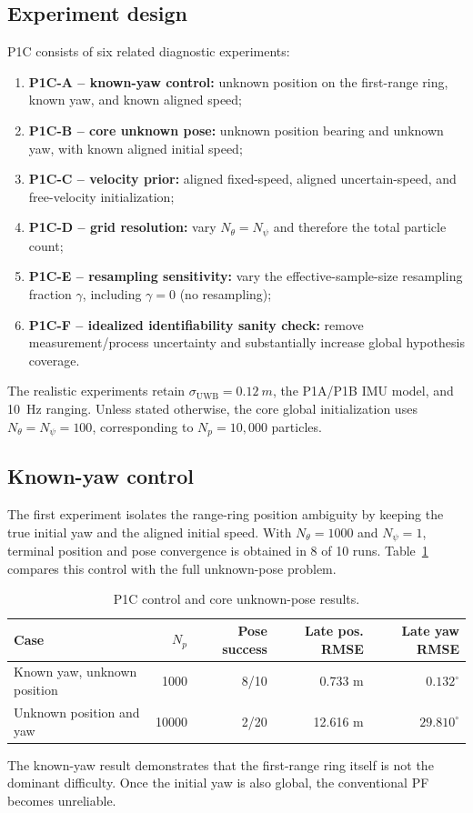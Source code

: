 \subsection{Experiment design}
P1C consists of six related diagnostic experiments:
\begin{enumerate}
    \item \textbf{P1C-A -- known-yaw control:} unknown position on the first-range ring, known yaw, and known aligned speed;
    \item \textbf{P1C-B -- core unknown pose:} unknown position bearing and unknown yaw, with known aligned initial speed;
    \item \textbf{P1C-C -- velocity prior:} aligned fixed-speed, aligned uncertain-speed, and free-velocity initialization;
    \item \textbf{P1C-D -- grid resolution:} vary $N_{\theta}=N_{\psi}$ and therefore the total particle count;
    \item \textbf{P1C-E -- resampling sensitivity:} vary the effective-sample-size resampling fraction $\gamma$, including $\gamma=0$ (no resampling);
    \item \textbf{P1C-F -- idealized identifiability sanity check:} remove measurement/process uncertainty and substantially increase global hypothesis coverage.
\end{enumerate}
The realistic experiments retain $\sigma_{\mathrm{UWB}}=\SI{0.12}{m}$, the P1A/P1B IMU model, and \SI{10}{Hz} ranging. Unless stated otherwise, the core global initialization uses $N_{\theta}=N_{\psi}=100$, corresponding to $N_p=10{,}000$ particles.

\subsection{Known-yaw control}
The first experiment isolates the range-ring position ambiguity by keeping the true initial yaw and the aligned initial speed. With $N_{\theta}=1000$ and $N_{\psi}=1$, terminal position and pose convergence is obtained in 8 of 10 runs. Table~\ref{tab:p1c_control_core} compares this control with the full unknown-pose problem.
\begin{table}[ht]
\centering
\caption{P1C control and core unknown-pose results.}
\label{tab:p1c_control_core}
\begin{tabular}{lrrrr}
\toprule
Case & $N_p$ & Pose success & Late pos. RMSE & Late yaw RMSE\\
\midrule
Known yaw, unknown position & 1000 & 8/10 & 0.733 m & $0.132^{\circ}$\\
Unknown position and yaw & 10000 & 2/20 & 12.616 m & $29.810^{\circ}$\\
\bottomrule
\end{tabular}
\end{table}
The known-yaw result demonstrates that the first-range ring itself is not the dominant difficulty. Once the initial yaw is also global, the conventional PF becomes unreliable.

